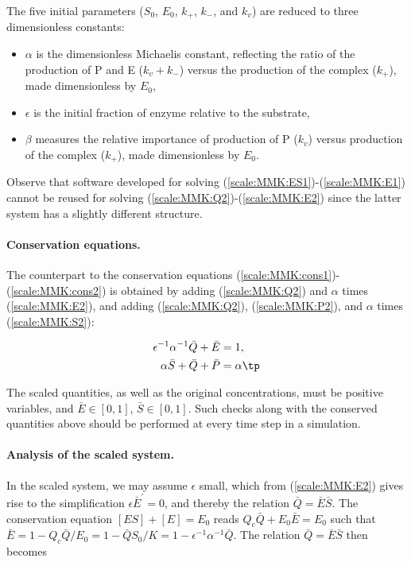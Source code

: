 \documentclass[graybox,envcountchap,sectrefs,final]{svmonodo}
\begin{document}
The five initial parameters ($S_0$, $E_0$, $k_+$, $k_-$, and $k_v$)
are reduced to three dimensionless constants:

\begin{itemize}
 \item $\alpha$ is the dimensionless Michaelis constant, reflecting the
   ratio of the production of P and E ($k_v+k_-$) versus the production of
   the complex ($k_+$), made dimensionless by $E_0$,

 \item $\epsilon$ is the initial fraction of enzyme relative to the substrate,

 \item $\beta$ measures the relative importance of production of P ($k_v$)
   versus production of the complex ($k_+$), made dimensionless by $E_0$.
\end{itemize}

\noindent
Observe that software developed for
solving (\ref{scale:MMK:ES1})-(\ref{scale:MMK:E1}) cannot be reused
for solving (\ref{scale:MMK:Q2})-(\ref{scale:MMK:E2}) since the latter
system has a slightly different structure.

\paragraph{Conservation equations.}
The counterpart to the conservation equations
(\ref{scale:MMK:cons1})-(\ref{scale:MMK:cons2}) is obtained by
adding (\ref{scale:MMK:Q2}) and $\alpha$ times (\ref{scale:MMK:E2}),
and adding (\ref{scale:MMK:Q2}), (\ref{scale:MMK:P2}), and
$\alpha$ times (\ref{scale:MMK:S2}):

\begin{align}
\epsilon^{-1}\alpha^{-1}\bar Q + \bar E &= 1,\\ 
\alpha\bar S + \bar Q + \bar P &= \alpha\tp
\end{align}

The scaled quantities, as well as the original concentrations, must be
positive variables, and $\bar E\in [0,1]$, $\bar S\in [0,1]$. Such checks
along with the conserved quantities above should be performed at every
time step in a simulation.

\paragraph{Analysis of the scaled system.}
In the scaled system, we may assume $\epsilon$ small, which from
(\ref{scale:MMK:E2}) gives rise to the simplification
$\epsilon\bar E^{\prime}=0$, and thereby the relation $\bar Q = \bar E\bar S$.
The conservation equation $[ES] + [E]= E_0$ reads $Q_c\bar Q + E_0\bar E =
E_0$ such that $\bar E = 1 - Q_c\bar Q/E_0=1- \bar Q S_0/K = 1 - \epsilon^{-1}\alpha^{-1}\bar Q$. The relation $\bar Q=\bar E\bar S$ then becomes
\end{document}
